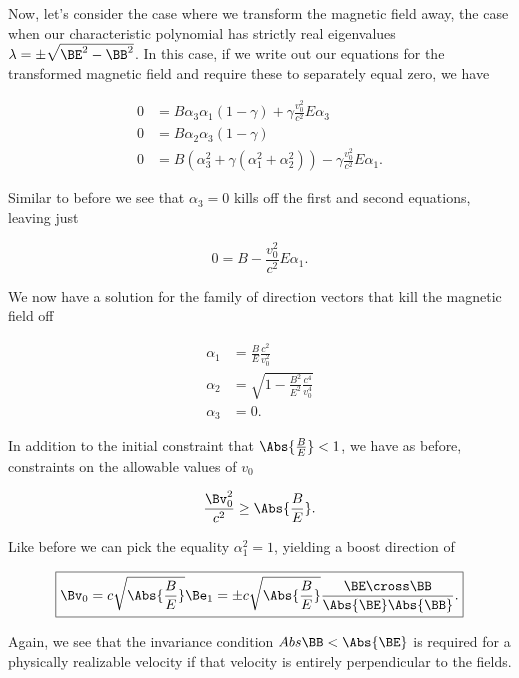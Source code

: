 Now, let's consider the case where we transform the magnetic field away, the case when our characteristic polynomial has strictly real eigenvalues $\lambda = \pm \sqrt{\BE^2 - \BB^2}$.  In this case, if we write out our equations for the transformed magnetic field and require these to separately equal zero, we have

\begin{align}\label{eqn:relElectroDynProblemSet3:1740}
0 &= B \alpha_3 \alpha_1 ( 1 - \gamma ) + \gamma \frac{v_0^2}{c^2} E \alpha_3 \\
0 &= B \alpha_2 \alpha_3 ( 1 - \gamma ) \\
0 &= B (\alpha_3^2 + \gamma (\alpha_1^2 + \alpha_2^2)) - \gamma \frac{v_0^2}{c^2} E \alpha_1.
\end{align}

Similar to before we see that $\alpha_3 = 0$ kills off the first and second equations, leaving just

\begin{equation}\label{eqn:relElectroDynProblemSet3:1760}
0 = B - \frac{v_0^2}{c^2} E \alpha_1.
\end{equation}

We now have a solution for the family of direction vectors that kill the magnetic field off

\begin{align}\label{eqn:relElectroDynProblemSet3:1780}
\alpha_1 &= \frac{B}{E} \frac{c^2}{v_0^2} \\
\alpha_2 &= \sqrt{ 1 - \frac{B^2}{E^2} \frac{c^4}{v_0^4} } \\
\alpha_3 &= 0.
\end{align}

In addition to the initial constraint that $\Abs{\frac{B}{E}} < 1$, we have as before, constraints on the allowable values of $v_0$

\begin{equation}\label{eqn:relElectroDynProblemSet3:1800}
\frac{\Bv_0^2}{c^2} \ge \Abs{\frac{B}{E}}.
\end{equation}

Like before we can pick the equality $\alpha_1^2 = 1$, yielding a boost direction of

\begin{equation}\label{eqn:relElectroDynProblemSet3:1880}
\boxed{
\Bv_0 = c \sqrt{\Abs{\frac{B}{E}}} \Be_1 = \pm c \sqrt{\Abs{\frac{B}{E}}} \frac{\BE \cross \BB}{\Abs{\BE} \Abs{\BB}}.
}
\end{equation}

Again, we see that the invariance condition $Abs{\BB} < \Abs{\BE}$ is required for a physically realizable velocity if that velocity is entirely perpendicular to the fields.
